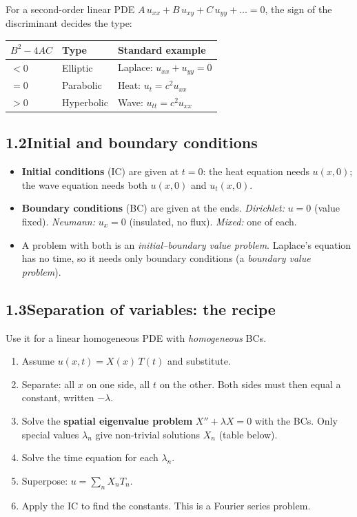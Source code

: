\documentclass[11pt]{article}
\begin{document}
For a second-order linear PDE $A\,u_{xx}+B\,u_{xy}+C\,u_{yy}+\dots=0$, the sign of the discriminant decides the type:

\begin{center}
\renewcommand{\arraystretch}{1.4}
\begin{tabular}{|l|l|l|}
\hline
\textbf{$B^2-4AC$} & \textbf{Type} & \textbf{Standard example}\\
\hline
$<0$ & Elliptic & Laplace: $u_{xx}+u_{yy}=0$\\
$=0$ & Parabolic & Heat: $u_t=c^2u_{xx}$\\
$>0$ & Hyperbolic & Wave: $u_{tt}=c^2u_{xx}$\\
\hline
\end{tabular}
\end{center}

\subsection*{1.2\quad Initial and boundary conditions}

\begin{itemize}
  \item \textbf{Initial conditions} (IC) are given at $t=0$: the heat equation needs $u(x,0)$; the wave equation needs both $u(x,0)$ and $u_t(x,0)$.
  \item \textbf{Boundary conditions} (BC) are given at the ends. \emph{Dirichlet:} $u=0$ (value fixed). \emph{Neumann:} $u_x=0$ (insulated, no flux). \emph{Mixed:} one of each.
  \item A problem with both is an \emph{initial--boundary value problem}. Laplace's equation has no time, so it needs only boundary conditions (a \emph{boundary value problem}).
\end{itemize}

\subsection*{1.3\quad Separation of variables: the recipe}

Use it for a linear homogeneous PDE with \emph{homogeneous} BCs.

\begin{enumerate}
  \item Assume $u(x,t)=X(x)\,T(t)$ and substitute.
  \item Separate: all $x$ on one side, all $t$ on the other. Both sides must then equal a constant, written $-\lambda$.
  \item Solve the \textbf{spatial eigenvalue problem} $X''+\lambda X=0$ with the BCs. Only special values $\lambda_n$ give non-trivial solutions $X_n$ (table below).
  \item Solve the time equation for each $\lambda_n$.
  \item Superpose: $u=\sum_n X_nT_n$.
  \item Apply the IC to find the constants. This is a Fourier series problem.
\end{enumerate}
\end{document}
